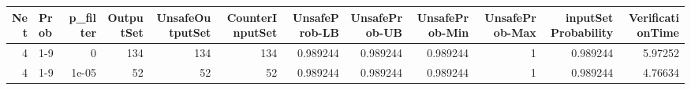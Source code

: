 \begin{tabular}{rlrrrrrrrrrr}
\hline
   Net & Prob   &   p\_filter &   OutputSet &   UnsafeOutputSet &   CounterInputSet &   UnsafeProb-LB &   UnsafeProb-UB &   UnsafeProb-Min &   UnsafeProb-Max &   inputSet Probability &   VerificationTime \\
\hline
     4 & 1-9    &      0     &         134 &               134 &               134 &        0.989244 &        0.989244 &         0.989244 &                1 &               0.989244 &            5.97252 \\
     4 & 1-9    &      1e-05 &          52 &                52 &                52 &        0.989244 &        0.989244 &         0.989244 &                1 &               0.989244 &            4.76634 \\
\hline
\end{tabular}
